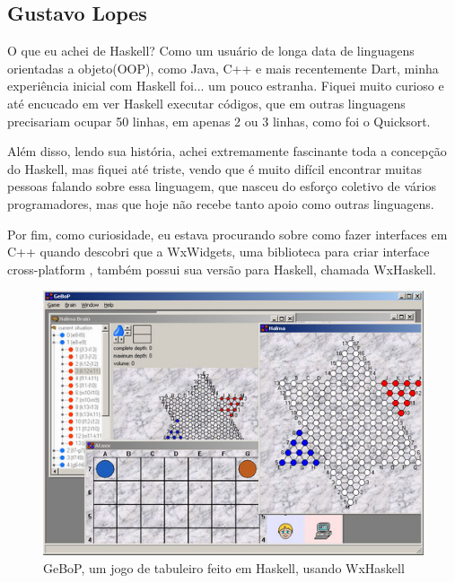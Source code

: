 \documentclass[
  article,			       %
  12pt,				         %
  oneside,			       %
  a4paper,			       %
  english,		       	 %
  brazil,			      	 %
  sumario=tradicional
]{abntex2}
\begin{document}
    
    \begin{apendicesenv}

        \partapendices
        \chapter{Gustavo Lopes}

        O que eu achei de Haskell? Como um usuário de longa data de linguagens orientadas a objeto(OOP), 
        como Java, C++ e mais recentemente Dart, minha experiência inicial com Haskell foi...
        um pouco estranha. Fiquei muito curioso e até encucado em ver Haskell executar códigos, que em
        outras linguagens precisariam ocupar 50 linhas, em apenas 2 ou 3 linhas, como foi o Quicksort.

        Além disso, lendo sua história, achei extremamente fascinante toda a concepção do Haskell,
        mas fiquei até triste, vendo que é muito difícil encontrar muitas pessoas falando sobre essa linguagem, que nasceu 
        do esforço coletivo de vários programadores, mas que hoje não recebe tanto apoio como outras linguagens.

        Por fim, como curiosidade, eu estava procurando sobre como fazer interfaces em C++ quando
        descobri que a WxWidgets, uma biblioteca para criar interface cross-platform , também possui 
        sua versão para Haskell, chamada WxHaskell.

        \begin{figure}[ht]
          \includegraphics[width =\textwidth]{gebob.png}
          \caption{GeBoP, um jogo de tabuleiro feito em Haskell, usando WxHaskell}
        \end{figure}


\end{apendicesenv}
\end{document}
